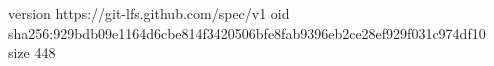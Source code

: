 version https://git-lfs.github.com/spec/v1
oid sha256:929bdb09e1164d6cbe814f3420506bfe8fab9396eb2ce28ef929f031c974df10
size 448
